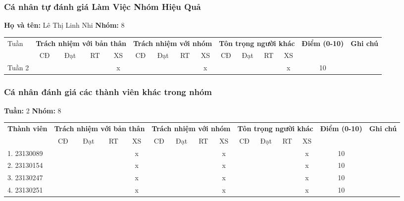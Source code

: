 \subsubsection*{Cá nhân tự đánh giá Làm Việc Nhóm Hiệu Quả}

\noindent \textbf{Họ và tên:} Lê Thị Linh Nhi \hrulefill \quad \textbf{Nhóm:} 8 \hrulefill

\vspace{0.5cm}

\begin{tabularx}{\linewidth}{|X|c|c|c|c|c|c|c|c|c|c|c|c|c|c|}
\hline
Tuần & \multicolumn{4}{c|}{\textbf{Trách nhiệm với bản thân}} & \multicolumn{4}{c|}{\textbf{Trách nhiệm với nhóm}} & \multicolumn{4}{c|}{\textbf{Tôn trọng người khác}} & \multirow{2}{1.5cm}{\textbf{Điểm (0-10)}} & \multirow{2}{1.5cm}{\textbf{Ghi chú}} \\ \cline{2-13}
 & CĐ & Đạt & RT & XS & CĐ & Đạt & RT & XS & CĐ & Đạt & RT & XS & & \\ \hline
  Tuần 2 & & & & x & & & & x & & & & x & 10 & \\ \hline
\end{tabularx}

\vspace{1cm}

\subsubsection*{Cá nhân đánh giá các thành viên khác trong nhóm}

\noindent \textbf{Tuần:} 2 \hrulefill \quad \textbf{Nhóm:} 8 \hrulefill

\vspace{0.5cm}

\begin{tabularx}{\linewidth}{|X|c|c|c|c|c|c|c|c|c|c|c|c|c|c|}
\hline
\multirow{2}{3cm}{\textbf{Thành viên}} & \multicolumn{4}{c|}{\textbf{Trách nhiệm với bản thân}} & \multicolumn{4}{c|}{\textbf{Trách nhiệm với nhóm}} & \multicolumn{4}{c|}{\textbf{Tôn trọng người khác}} & \multirow{2}{1.2cm}{\textbf{Điểm (0-10)}} & \multirow{2}{1.5cm}{\textbf{Ghi chú}} \\ \cline{2-13}
 & CĐ & Đạt & RT & XS & CĐ & Đạt & RT & XS & CĐ & Đạt & RT & XS & & \\ \hline
1. 23130089 & & & & x & & & & x & & & & x & 10 & \\ \hline
2. 23130154 & & & & x & & & & x & & & & x & 10 & \\ \hline
3. 23130247 & & & & x & & & & x & & & & x & 10 & \\ \hline
4. 23130251 & & & & x & & & & x & & & & x & 10 & \\ \hline
\end{tabularx}
